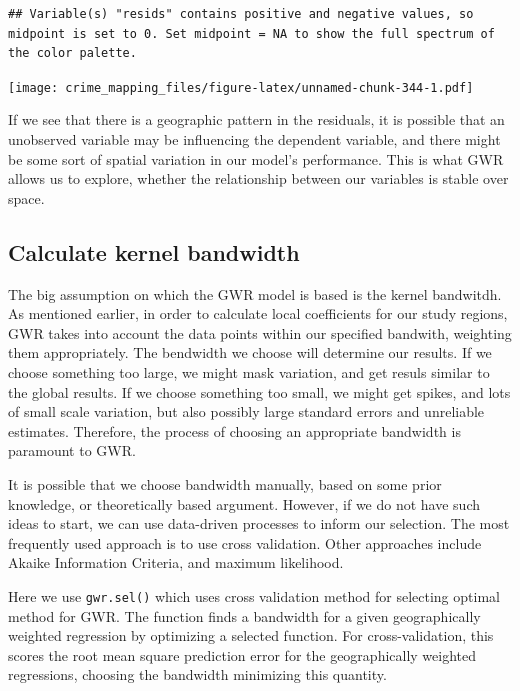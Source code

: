 \documentclass[
  krantz2]{krantz}
\begin{document}
\begin{verbatim}
## Variable(s) "resids" contains positive and negative values, so midpoint is set to 0. Set midpoint = NA to show the full spectrum of the color palette.
\end{verbatim}

\texttt{[image: crime\_mapping\_files/figure-latex/unnamed-chunk-344-1.pdf]}

If we see that there is a geographic pattern in the residuals, it is possible that an unobserved variable may be influencing the dependent variable, and there might be some sort of spatial variation in our model's performance. This is what GWR allows us to explore, whether the relationship between our variables is stable over space.

\hypertarget{calculate-kernel-bandwidth}{%
\subsection{Calculate kernel bandwidth}\label{calculate-kernel-bandwidth}}

The big assumption on which the GWR model is based is the kernel bandwitdh. As mentioned earlier, in order to calculate local coefficients for our study regions, GWR takes into account the data points within our specified bandwith, weighting them appropriately. The bendwidth we choose will determine our results. If we choose something too large, we might mask variation, and get resuls similar to the global results. If we choose something too small, we might get spikes, and lots of small scale variation, but also possibly large standard errors and unreliable estimates. Therefore, the process of choosing an appropriate bandwidth is paramount to GWR.

It is possible that we choose bandwidth manually, based on some prior knowledge, or theoretically based argument. However, if we do not have such ideas to start, we can use data-driven processes to inform our selection. The most frequently used approach is to use cross validation. Other approaches include Akaike Information Criteria, and maximum likelihood.

Here we use \texttt{gwr.sel()} which uses cross validation method for selecting optimal method for GWR. The function finds a bandwidth for a given geographically weighted regression by optimizing a selected function. For cross-validation, this scores the root mean square prediction error for the geographically weighted regressions, choosing the bandwidth minimizing this quantity.
\end{document}
